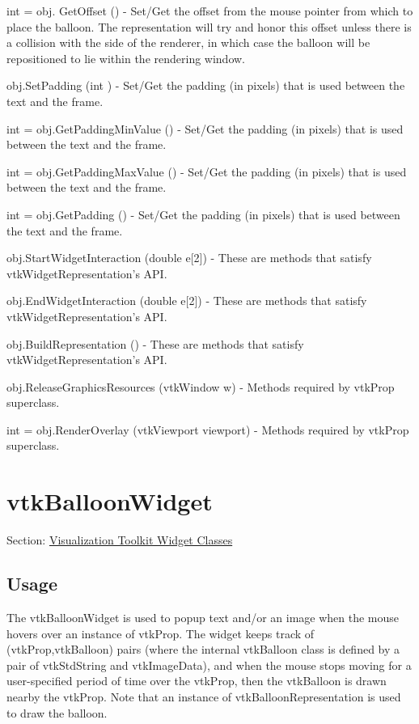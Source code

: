 \begin{DoxyItemize}
\item {\ttfamily int = obj. Get\-Offset ()} -\/ Set/\-Get the offset from the mouse pointer from which to place the balloon. The representation will try and honor this offset unless there is a collision with the side of the renderer, in which case the balloon will be repositioned to lie within the rendering window.  
\item {\ttfamily obj.\-Set\-Padding (int )} -\/ Set/\-Get the padding (in pixels) that is used between the text and the frame.  
\item {\ttfamily int = obj.\-Get\-Padding\-Min\-Value ()} -\/ Set/\-Get the padding (in pixels) that is used between the text and the frame.  
\item {\ttfamily int = obj.\-Get\-Padding\-Max\-Value ()} -\/ Set/\-Get the padding (in pixels) that is used between the text and the frame.  
\item {\ttfamily int = obj.\-Get\-Padding ()} -\/ Set/\-Get the padding (in pixels) that is used between the text and the frame.  
\item {\ttfamily obj.\-Start\-Widget\-Interaction (double e\mbox{[}2\mbox{]})} -\/ These are methods that satisfy vtk\-Widget\-Representation's A\-P\-I.  
\item {\ttfamily obj.\-End\-Widget\-Interaction (double e\mbox{[}2\mbox{]})} -\/ These are methods that satisfy vtk\-Widget\-Representation's A\-P\-I.  
\item {\ttfamily obj.\-Build\-Representation ()} -\/ These are methods that satisfy vtk\-Widget\-Representation's A\-P\-I.  
\item {\ttfamily obj.\-Release\-Graphics\-Resources (vtk\-Window w)} -\/ Methods required by vtk\-Prop superclass.  
\item {\ttfamily int = obj.\-Render\-Overlay (vtk\-Viewport viewport)} -\/ Methods required by vtk\-Prop superclass.  
\end{DoxyItemize}\hypertarget{vtkwidgets_vtkballoonwidget}{}\section{vtk\-Balloon\-Widget}\label{vtkwidgets_vtkballoonwidget}
Section\-: \hyperlink{sec_vtkwidgets}{Visualization Toolkit Widget Classes} \hypertarget{vtkwidgets_vtkxyplotwidget_Usage}{}\subsection{Usage}\label{vtkwidgets_vtkxyplotwidget_Usage}
The vtk\-Balloon\-Widget is used to popup text and/or an image when the mouse hovers over an instance of vtk\-Prop. The widget keeps track of (vtk\-Prop,vtk\-Balloon) pairs (where the internal vtk\-Balloon class is defined by a pair of vtk\-Std\-String and vtk\-Image\-Data), and when the mouse stops moving for a user-\/specified period of time over the vtk\-Prop, then the vtk\-Balloon is drawn nearby the vtk\-Prop. Note that an instance of vtk\-Balloon\-Representation is used to draw the balloon.

